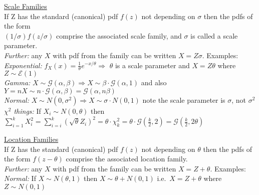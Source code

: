 \documentclass[11pt]{article}
\newcommand{\ExpDist}{\mathcal{E}}
\begin{document}
\indent\underline{Scale Families}\\
If Z has the standard (canonical)  pdf $f(z)$ not depending on $\sigma$ then the pdfs of
the form\\
$(1/\sigma)f(z/\sigma)$ comprise the associated scale family, and $\sigma$ is called
a scale parameter.\\
\hspace*{1.5em}\textsl{Further:} any $X$ with pdf from the family can be written $X =
Z\sigma$.  Examples:\\
\hspace*{2em}\textsl{Exponential:} $f_X(x) = \frac{1}{\theta} e^{-x/\theta}
\Longrightarrow$
$\theta$ is a scale parameter  and $X=Z\theta$ where $Z\sim \ExpDist(1)$\\
\hspace*{2em}\textsl{Gamma:}  $X \sim \mathcal{G}(\alpha,\beta) \Longrightarrow X
\sim \beta\cdot\mathcal{G}(\alpha,1)$ and also $Y=nX\sim
n\cdot\mathcal{G}(\alpha,\beta) = \mathcal{G}(\alpha,n\beta)$\\
%
\hspace*{2em}\textsl{Normal:}  $X \sim N(0,\sigma^2) \Longrightarrow X \sim \sigma
\cdot N(0,1)$ note the scale parameter is $\sigma$, not $\sigma^2$\\
%
\hspace*{2em}\textsl{$\chi^2$ things:} If $X_i\sim N(0,\theta)$ then $\sum_{i=1}^k X_i^2
=\sum_{i=i}^k (\sqrt{\theta} Z_i)^2 = \theta\cdot\chi^2_{k} =
\theta\cdot\mathcal{G}(\frac{k}{2},2) = \mathcal{G}(\frac{k}{2},2\theta)$

\indent\underline{Location Families}\\
If Z has the standard (canonical)  pdf $f(z)$ not depending on $\theta$ then the pdfs of
the form $f(z-\theta)$ comprise the associated location family.\\
%
\hspace*{1.5em}\textsl{Further:} any $X$ with pdf from the family can be written $X =
Z + \theta$.  Examples:\\
%
\hspace*{2em}\textsl{Normal:} If $X \sim N(\theta,1)$ then $X \sim \theta + N(0,1)$ i.e.\
$X= Z + \theta$ where $Z\sim N(0,1)$
\end{document}
